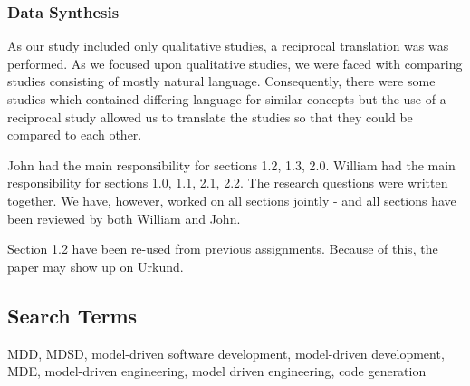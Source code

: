\documentclass[10pt,twocolumn]{article}
\begin{document}
\subsubsection{Data Synthesis}

As our study included only qualitative studies, a reciprocal translation was was performed. As we focused upon qualitative studies, we were faced with comparing studies consisting of mostly natural language. Consequently, there were some studies which contained differing language for similar concepts but the use of a reciprocal study allowed us to translate the studies so that they could be compared to each other.  





John had the main responsibility for sections 1.2, 1.3, 2.0. William had the main responsibility for sections 1.0, 1.1, 2.1, 2.2. The research questions were written together. We have, however, worked on all sections jointly - and all sections have been reviewed by both William and John. 

Section 1.2 have been re-used from previous assignments. Because of this, the paper may show up on Urkund. 


\begin{appendices}
\section{Search Terms}
MDD, MDSD, model-driven software development, model-driven development, MDE, model-driven engineering, model driven engineering, code generation
\end{appendices}
\end{document}
